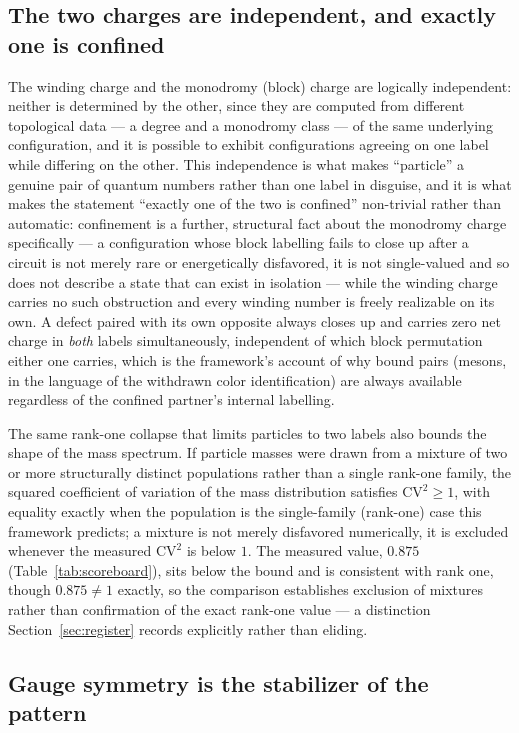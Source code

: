 \documentclass[pdflatex,sn-mathphys-num]{sn-jnl}
\theoremstyle{thmstyleone}
\theoremstyle{thmstylethree}
\theoremstyle{thmstyletwo}
\begin{document}
\subsection{The two charges are independent, and exactly one is confined}

The winding charge and the monodromy (block) charge are logically
independent: neither is determined by the other, since they are computed
from different topological data — a degree and a monodromy class — of
the same underlying configuration, and it is possible to exhibit
configurations agreeing on one label while differing on the other. This
independence is what makes ``particle'' a genuine pair of quantum
numbers rather than one label in disguise, and it is what makes the
statement ``exactly one of the two is confined'' non-trivial rather than
automatic: confinement is a further, structural fact about the
monodromy charge specifically — a configuration whose block labelling
fails to close up after a circuit is not merely rare or energetically
disfavored, it is not single-valued and so does not describe a state
that can exist in isolation — while the winding charge carries no such
obstruction and every winding number is freely realizable on its own. A
defect paired with its own opposite always closes up and carries zero
net charge in \emph{both} labels simultaneously, independent of which
block permutation either one carries, which is the framework's account
of why bound pairs (mesons, in the language of the withdrawn color
identification) are always available regardless of the confined
partner's internal labelling.

The same rank-one collapse that limits particles to two labels also
bounds the shape of the mass spectrum. If particle masses were drawn from
a mixture of two or more structurally distinct populations rather than a
single rank-one family, the squared coefficient of variation of the mass
distribution satisfies $\mathrm{CV}^2 \geq 1$, with equality exactly when
the population is the single-family (rank-one) case this framework
predicts; a mixture is not merely disfavored numerically, it is excluded
whenever the measured $\mathrm{CV}^2$ is below $1$. The measured value,
$0.875$ (Table~\ref{tab:scoreboard}), sits below the bound and is
consistent with rank one, though $0.875 \neq 1$ exactly, so the
comparison establishes exclusion of mixtures rather than confirmation of
the exact rank-one value — a distinction Section~\ref{sec:register}
records explicitly rather than eliding.

\subsection{Gauge symmetry is the stabilizer of the pattern}
\end{document}
